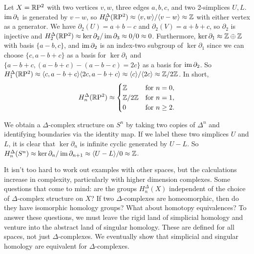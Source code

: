 \begin{example}
    Let $X=\mathbb{R} \mathrm P^2$ with two vertices $v,w$, three edges $a,b,c$, and two 2-simplices $U,L$. $\operatorname{im} \partial_1 $ is generated by $v-w$, so $H_0^{\Delta}(\mathbb{R} \mathrm P^2) \approx \langle v,w \rangle / \langle v-w \rangle\approx \mathbb{Z} $ with either vertex as a generator. We have $\partial_2(U)=a+b-c $ and $\partial_2(V)=a+b+c $, so $\partial_2 $ is injective and $H_2^{\Delta}(\mathbb{R} \mathrm P^2)\approx \ker \partial_2 / \operatorname{im} \partial_3\approx0 /0\approx 0  $. Furthermore, $\ker \partial_1\approx \mathbb{Z}\oplus \mathbb{Z} $ with basis $\{a-b,c\} $, and $\operatorname{im} \partial_2 $ is an index-two subgroup of $\ker \partial_1 $ since we can choose $\{c,a-b+c\} $ as a basis for $\ker \partial_1 $ and $\{a-b+c,(a-b+c)-(a-b-c)=2c\} $ as a basis for $\operatorname{im} \partial_2 $. So $H_1^{\Delta}(\mathbb{R} \mathrm P^2)\approx \langle c,a-b+c \rangle \langle 2c, a-b+c \rangle \approx \langle c \rangle /\langle 2c \rangle \approx \mathbb{Z} /2\mathbb{Z}$. In short, \[
        H_n ^{\Delta}(\mathbb{R} \mathrm P^2) \approx
        \begin{cases}
            \mathbb{Z} & \text{for} \ n=0,\\
            \mathbb{Z} /2 \mathbb{Z} & \text{for} \ n=1,\\
            0 & \text{for} \ n\geq 2.
        \end{cases}
    \] 
\end{example}

\begin{example}
    We obtain a $\Delta$-complex structure on $S^n $ by taking two copies of $\Delta^n $ and identifying boundaries via the identity map. If we label these two simplices $U$ and $L$, it is clear that $\ker \partial _n $ is infinite cyclic generated by $U-L$. So $H_n ^{\Delta}(S^n )\approx \ker \partial _n /\operatorname{im} \partial _{n+1}\approx \langle U-L \rangle /0\approx  \mathbb{Z}$.
\end{example}

It isn't too hard to work out examples with other  spaces, but the calculations increase in complexity, particularly with higher dimension complexes. Some questions that come to mind: are the groups $H_n ^{\Delta}(X)$ independent of the choice of $\Delta$-complex structure on $X$? If two $\Delta$-complexes are homeomorphic, then do they have isomorphic homology groups? What about homotopy equivalences? To answer these questions, we must leave the rigid land of simplicial homology and venture into the abstract land of singular homology. These are defined for all spaces, not just $\Delta$-complexes. We eventually show that simplicial and singular homology are equivalent for $\Delta$-complexes.

